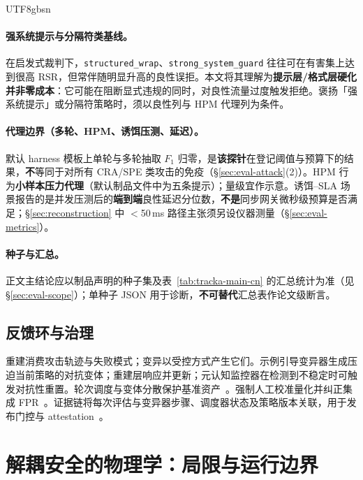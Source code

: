 \documentclass[letterpaper,twocolumn,10pt]{article}
\begin{document}
\begin{CJK}{UTF8}{gbsn}
\paragraph{强系统提示与分隔符类基线。}
在启发式裁判下，\texttt{structured\_wrap}、\texttt{strong\_system\_guard} 往往可在有害集上达到很高 RSR，但常伴随明显升高的良性误拒。本文将其理解为\textbf{提示层/格式层硬化并非零成本}：它可能在阻断显式违规的同时，对良性流量过度触发拒绝。褒扬「强系统提示」或分隔符策略时，须以良性列与 HPM 代理列为条件。

\paragraph{代理边界（多轮、HPM、诱饵压测、延迟）。}
默认 harness 模板上单轮与多轮抽取 $F_1$ 归零，是\textbf{该探针}在登记阈值与预算下的结果，\textbf{不}等同于对所有 CRA/SPE 类攻击的免疫（\S\ref{sec:eval-attack}(2)）。HPM 行为\textbf{小样本压力代理}（默认制品文件中为五条提示）；量级宜作示意。诱饵--SLA 场景报告的是并发压测后的\textbf{端到端}良性延迟分位数，\textbf{不是}同步网关微秒级预算是否满足；\S\ref{sec:reconstruction} 中 $<$50\,ms 路径主张须另设仪器测量（\S\ref{sec:eval-metrics}）。

\paragraph{种子与汇总。}
正文主结论应以制品声明的种子集及表~\ref{tab:tracka-main-cn} 的汇总统计为准（见 \S\ref{sec:eval-scope}）；单种子 JSON 用于诊断，\textbf{不可替代}汇总表作论文级断言。



\subsection{反馈环与治理}

重建消费攻击轨迹与失败模式；变异以受控方式产生它们。示例引导变异器生成压迫当前策略的对抗变体；重建层响应并更新；元认知监控器在检测到不稳定时可触发对抗性重置。轮次调度与变体分散保护基准资产~\cite{ControlledMutation_SafetyEval}。强制人工校准量化并纠正集成 FPR~\cite{tc260-governance}。证据链将每次评估与变异器步骤、调度器状态及策略版本关联，用于发布门控与 attestation~\cite{dual-use-attestations,ControlledMutation_SafetyEval}。

\section{解耦安全的物理学：局限与运行边界}
\label{sec:physics}


\end{CJK}
\end{document}
